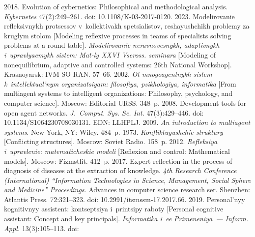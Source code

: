 \begin{multicols}{2}
{\small\frenchspacing
 {%
 \begin{thebibliography}{99} 
    2018. Evolution of cybernetics: Philosophical and methodological analysis. 
\textit{Kybernetes} 47(2):249--261. doi: 10.1108/K-03-2017-0120.
    2023. Modelirovanie refleksivnykh pro\-tses\-sov v~kollektivakh 
spetsialistov, reshayushchikh problemy za kruglym stolom [Modeling reflexive processes in teams 
of specialists solving problems at a round table]. \textit{Modelirovanie neravnovesnykh, 
adaptivnykh i~uprav\-lya\-emykh sistem: Mat-ly XXVI Vseross. seminara} [Modeling of 
nonequilibrium, adaptive and controlled systems: 26th National Workshop]. Krasnoyarsk: 
IVM SO RAN. 57--66. 
    2002. \textit{Ot mnogoagentnykh sistem k~intellektual'nym 
organizatsiyam: filosofiya, psikhologiya, informatika} [From multiagent systems to intelligent 
organizations: Philosophy, psychology, and computer science]. Moscow: Editorial URSS. 348~p.
    2008. 
Development tools for open agent networks. \textit{J.~Comput. Sys. Sc. Int.} 
47(3):429--446. doi: 10.1134/S1064230708030131. EDN: LLHPLJ.
    2009. \textit{An introduction to multiagent systems}. New York, NY: 
Wiley. 484~p.
    1973. \textit{Konfliktuyushchie struktury} [Conflicting structures]. 
Moscow: Soviet Radio. 158~p.
    2012. \textit{Refleksiya i~upravlenie: 
matematicheskie modeli} [Reflexion and control: Mathematical models]. Moscow: 
Fizmstlit. 412~p.
    2017. Expert reflection in the process of diagnosis of diseases at the 
extraction of knowledge. \textit{4th Research Conference (International)  ``Information 
Technologies in Science, Management, Social Sphere and Medicine'' Proceedings}. Advances in 
computer science research ser. Shenzhen: Atlantis Press. 72:321--323. doi: 
 10.2991/\linebreak  itsmssm-17.2017.66.
    2019. Personal'nyy 
kognitivnyy assistent: kon\-tsep\-tsiya i~printsipy raboty [Personal cognitive assistant: Concept and 
key principals]. \textit{Informatika i~ee Primeneniya~--- Inform. Appl.} 13(3):105--113. doi: 

\end{thebibliography}}}
\end{multicols}
